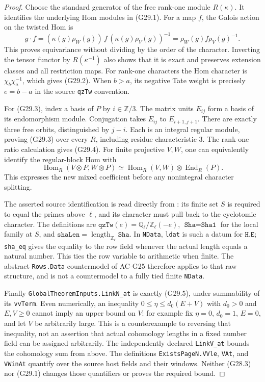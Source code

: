 \begin{proof}
Choose the standard generator of the free rank-one module
$R(\kappa)$.  It identifies the underlying Hom modules in
(G29.1).  For a map $f$, the Galois action on the twisted Hom
is
\[
 g\cdot f=(\kappa(g)\rho_W(g))\,f\,
                 (\kappa(g)\rho_V(g))^{-1}
            =\rho_W(g)f\rho_V(g)^{-1}.
\]
This proves equivariance without dividing by the order of
the character.  Inverting the tensor functor by
$R(\kappa^{-1})$ also shows that it is exact and preserves
extension classes and all restriction maps.  For rank-one
characters the Hom character is $\chi_b\chi_a^{-1}$,
which gives (G29.2).  When $b>a$, its negative Tate weight
is precisely $e=b-a$ in the source \texttt{qzTw} convention.

For (G29.3), index a basis of $P$ by $i\in\mathbb Z/3$.
The matrix units $E_{ij}$ form a basis of its endomorphism
module.  Conjugation takes $E_{ij}$ to $E_{i+1,j+1}$.
There are exactly three free orbits, distinguished by
$j-i$.  Each is an integral regular module, proving (G29.3)
over every $R$, including residue characteristic $3$.
The rank-one ratio calculation gives (G29.4).
For finite projective $V,W$, one can equivalently identify
the regular-block Hom with
\[
 \operatorname{Hom}_R(V\otimes P,W\otimes P)
       \simeq\operatorname{Hom}_R(V,W)
                    \otimes\operatorname{End}_R(P).
\]
This expresses the new mixed coefficient before any
nonintegral character splitting.

The asserted source identification is read directly from
: its finite set
$S$ is required to equal the primes above $\ell$, and its
character must pull back to the cyclotomic character.
The definitions are
$\texttt{qzTw}(e)=\mathbb Q_\ell/\mathbb Z_\ell(-e)$,
$\texttt{Sha}=\texttt{Sha1}$ for the local family at $S$,
and $\texttt{shaLen}=\operatorname{length}_{\mathbb Z_\ell}
\texttt{Sha}$.
In \texttt{NData}, \texttt{ldat} is such a datum for
$\texttt{H.E}$; \texttt{sha\_eq} gives the equality to the
row field whenever the actual length equals a natural number.
This ties the row variable to arithmetic when finite.  The
abstract \texttt{Rows.Data} countermodel of AC-G25 therefore
applies to that raw structure, and is not a countermodel to
a fully tied finite \texttt{NData}.

Finally \texttt{GlobalTheoremInputs.LinkN\_at} is exactly
(G29.5), under summability of its \texttt{vvTerm}.
Even numerically, an inequality
$0\le\eta\le d_0(E+V)$ with $d_0>0$ and $E,V\ge0$
cannot imply an upper bound on $V$: for example fix
$\eta=0$, $d_0=1$, $E=0$, and let $V$ be arbitrarily large.
This is a counterexample to reversing that inequality,
not an assertion that actual cohomology lengths in a fixed
number field can be assigned arbitrarily.
The independently declared \texttt{LinkV\_at} bounds the
cohomology sum from above.  The definitions
\texttt{ExistsPageN.VVle}, \texttt{VAt}, and
\texttt{VWinAt} quantify over the source host fields and
their windows.  Neither (G28.3) nor (G29.1) changes those
quantifiers or proves the required bound.
\end{proof}

